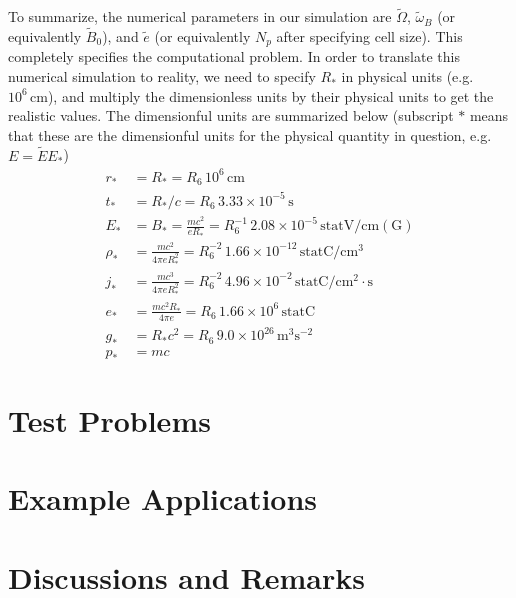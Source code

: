 To summarize, the numerical parameters in our simulation are $\tilde{\Omega}$,
$\tilde{\omega}_B$ (or equivalently $\tilde{B}_{0}$), and $\tilde{e}$ (or
equivalently $N_p$ after specifying cell size). This completely specifies the
computational problem. In order to translate this numerical simulation to
reality, we need to specify $R_{*}$ in physical units (e.g.\ $10^6\,
\mathrm{cm}$), and multiply the dimensionless units by their physical units to
get the realistic values. The dimensionful units are summarized below (subscript
$*$ means that these are the dimensionful units for the physical quantity in
question, e.g.\ $E = \tilde{E} E_*$)
\begin{align}
  r_{*} &= R_{*} = R_6\, 10^6\, \mathrm{cm} \\
  t_{*} &= R_{*} / c = R_6\,3.33\times 10^{-5}\, \mathrm{s} \\
  E_{*} &= B_{*} = \frac{mc^2}{eR_{*}} = R_6^{-1}\, 2.08\times 10^{-5}\, \mathrm{statV/cm(G)} \\
  \rho_{*} &= \frac{mc^2}{4\pi eR_{*}^2} = R_{6}^{-2}\, 1.66\times 10^{-12}\, \mathrm{statC/cm^3} \\
  j_{*} &= \frac{mc^3}{4\pi eR_{*}^2} = R_{6}^{-2}\, 4.96\times 10^{-2}\, \mathrm{statC/cm^2\cdot s}  \\
  e_{*} &= \frac{mc^2R_{*}}{4\pi e} = R_6\, 1.66\times 10^6\, \mathrm{statC} \\
  g_{*} &= R_{*}c^2 = R_6\, 9.0\times 10^{26}\, \mathrm{m^3s^{-2}} \\
  p_{*} &= mc
\end{align}

\section{Test Problems}
\label{sec:test-problems}

\section{Example Applications}
\label{sec:example-applications}

\section{Discussions and Remarks}
\label{sec:discussions}

